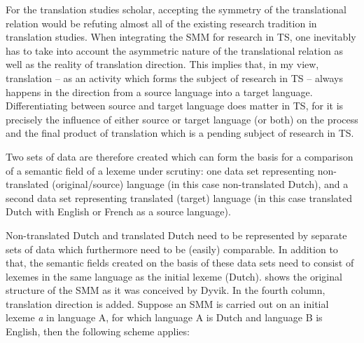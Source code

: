For the translation studies scholar, accepting the symmetry of the translational relation would be refuting almost all of the existing research tradition in translation studies. When integrating the SMM for research in TS, one inevitably has to take into account the asymmetric nature of the translational relation as well as the reality of translation direction. This implies that, in my view, translation – as an activity which forms the subject of research in TS – always happens in the direction from a source language into a target language. Differentiating between source and target language does matter in TS, for it is precisely the influence of either source or target language (or both) on the process and the final product of translation which is a pending subject of research in TS.

Two sets of data are therefore created which can form the basis for a comparison of a semantic field of a lexeme under scrutiny: one data set representing non-translated (original\slash source) language (in this case non-translated Dutch), and a second data set representing translated (target) language (in this case translated Dutch with English or French as a source language).

Non-translated Dutch and translated Dutch need to be represented by separate sets of data which furthermore need to be (easily) comparable. In addition to that, the semantic fields created on the basis of these data sets need to consist of lexemes in the same language as the initial lexeme (Dutch).  shows the original structure of the SMM as it was conceived by Dyvik. In the fourth column, translation direction is added. Suppose an SMM is carried out on an initial lexeme \textit{a} in language A, for which language A is Dutch and language B is English, then the following scheme applies:

\begin{table}
\caption{\label{tab:3:1} Source and target language in the different steps of the SMM}

\end{table}
  
